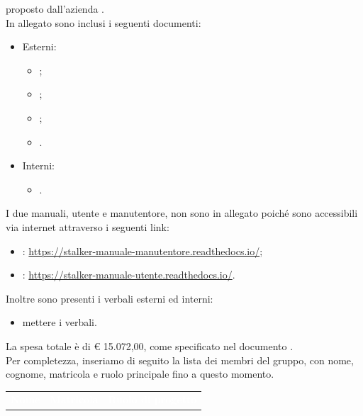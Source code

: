 \documentclass[12pt]{letter}
\begin{document}
\begin{letter}
        proposto dall'azienda \textbf{\Proponente{}}.\\
        In allegato sono inclusi i seguenti documenti:
        \begin{itemize}
            \item Esterni:
            \begin{itemize}
                \item {};
                \item {};
                \item {};
                \item {}.
            \end{itemize}
            \item Interni:
            \begin{itemize}
                \item {}.
            \end{itemize}
        \end{itemize}
        I due manuali, utente e manutentore, non sono in allegato poiché sono accessibili via internet attraverso i seguenti link:
        \begin{itemize}
            \item {}: \href{https://stalker-manuale-manutentore.readthedocs.io/}{https://stalker-manuale-manutentore.readthedocs.io/};
            \item {}: \href{https://stalker-manuale-utente.readthedocs.io/}{https://stalker-manuale-utente.readthedocs.io/}.
        \end{itemize}
        Inoltre sono presenti i verbali esterni ed interni:
        \begin{itemize}
            \item mettere i verbali.
        \end{itemize}
        La spesa totale è di \euro{} 15.072,00, come specificato nel documento \PdP{}.\\
        Per completezza, inseriamo di seguito la lista dei membri del gruppo, con nome, cognome, matricola e ruolo principale fino a questo momento.
        {
            \renewcommand{\arraystretch}{1.5}
            \begin{longtable}{ C{4cm} C{3cm} C{6cm} }
                \textcolor{white}{\textbf{Nome}} & \textcolor{white}{\textbf{Matricola}} & \textcolor{white}{\textbf{Ruolo di progetto}}\\

\end{longtable}}
\end{letter}
\end{document}
